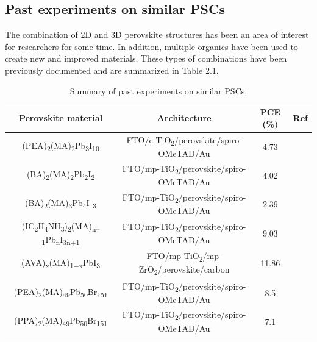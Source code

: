 \subsection{Past experiments on similar PSCs}
The combination of 2D and 3D perovskite structures has been an area of interest for researchers for some time. In addition, multiple organics have been used to create new and improved materials. These types of combinations have been previously documented and are summarized in Table 2.1.
\begin{table}[htb]
\caption{Summary of past experiments on similar PSCs.}
\begin{adjustbox}{max width=1\textwidth,center}
\begin{tabular}{c c c c}
\hline
    \textbf{Perovskite material} & \textbf{Architecture} & \textbf{PCE (\%)} & \textbf{Ref}\\ \hline
    (PEA)\textsubscript{2}(MA)\textsubscript{2}Pb\textsubscript{3}I\textsubscript{10}           & FTO/c-TiO\textsubscript{2}/perovskite/spiro-OMeTAD/Au  & 4.73  & {\cite{smith_layered_2014}} \\ \hline
    (BA)\textsubscript{2}(MA)\textsubscript{2}Pb\textsubscript{2}I\textsubscript{2}            & FTO/mp-TiO\textsubscript{2}/perovskite/spiro-OMeTAD/Au & 4.02  & {\cite{cao_2d_2015}} \\ \hline
    (BA)\textsubscript{2}(MA)\textsubscript{3}Pb\textsubscript{4}I\textsubscript{13}            & FTO/mp-TiO\textsubscript{2}/perovskite/spiro-OMeTAD/Au & 2.39  & {\cite{cao_2d_2015}} \\ \hline
    (IC\textsubscript{2}H\textsubscript{4}NH\textsubscript{3})\textsubscript{2}(MA)\textsubscript{n–1}Pb\textsubscript{n}I\textsubscript{3n+1}  & FTO/mp-TiO\textsubscript{2}/perovskite/spiro-OMeTAD/Au & 9.03  & {\cite{koh_nanostructuring_2016}}\\ \hline
    (AVA)\textsubscript{x}(MA)\textsubscript{1−x}PbI\textsubscript{3}           & FTO/mp-TiO\textsubscript{2}/mp-ZrO\textsubscript{2}/perovskite/carbon  & 11.86 & {\cite{saparov_organicinorganic_2016}}\\ \hline
    (PEA)\textsubscript{2}(MA)\textsubscript{49}Pb\textsubscript{50}Br\textsubscript{151}       & FTO/mp-TiO\textsubscript{2}/perovskite/spiro-OMeTAD/Au & 8.5   & {\cite{cohen_high_2017-1}} \\ \hline
    (PPA)\textsubscript{2}(MA)\textsubscript{49}Pb\textsubscript{50}Br\textsubscript{151}       & FTO/mp-TiO\textsubscript{2}/perovskite/spiro-OMeTAD/Au & 7.1   & {\cite{cohen_high_2017}} \\ \hline

\end{tabular}
\end{adjustbox}
\end{table}
